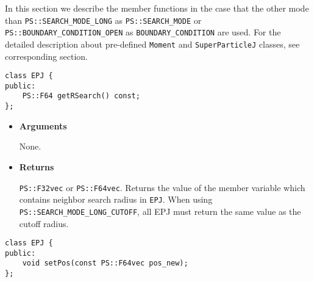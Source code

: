 In this section we describe the member functions in the case that the other
mode than \texttt{PS::SEARCH\_MODE\_LONG} as \texttt{PS::SEARCH\_MODE} or
\texttt{PS::BOUNDARY\_CONDITION\_OPEN} as \texttt{BOUNDARY\_CONDITION} are used.
For the detailed description about pre-defined \texttt{Moment} and
\texttt{SuperParticleJ} classes, see corresponding section.



\begin{screen}
\begin{verbatim}
class EPJ {
public:
    PS::F64 getRSearch() const;
};
\end{verbatim}
\end{screen}

\begin{itemize}

\item {\bf Arguments}

  None.
  
\item {\bf Returns}

  \texttt{PS::F32vec} or \texttt{PS::F64vec}.
  Returns the value of the member variable which contains neighbor search radius in \texttt{EPJ}. When using \texttt{PS::SEARCH\_MODE\_LONG\_CUTOFF}, all EPJ must return the same value as the cutoff radius.

\end{itemize}



\begin{screen}
\begin{verbatim}
class EPJ {
public:
    void setPos(const PS::F64vec pos_new);
};
\end{verbatim}
\end{screen}

